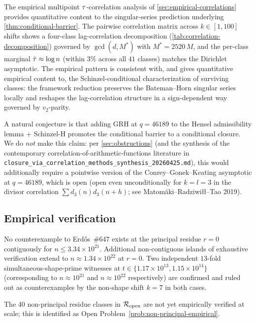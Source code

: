 \begin{remark}
\label{rem:conditional-empirical-anchor}
The empirical multipoint $\tau$-correlation analysis of
\cref{sec:empirical-correlations} provides quantitative content to
the singular-series prediction underlying
\cref{thm:conditional-barrier}. The pairwise correlation matrix
across $k \in [1, 100]$ shifts shows a four-class lag-correlation
decomposition (\cref{tab:correlation-decomposition}) governed by
$\gcd(d, M^*)$ with $M^* = 2520\, M$, and the per-class marginal
$\bar{\tau} \approx \log n$ (within $3\%$ across all $41$ classes)
matches the Dirichlet asymptotic. The empirical pattern is consistent
with, and gives quantitative empirical content to, the
Schinzel-conditional characterization of surviving classes: the
framework reduction preserves the Bateman--Horn singular series
locally and reshapes the lag-correlation structure in a
sign-dependent way governed by $v_2$-parity.
\end{remark}

\begin{remark}
\label{rem:no-cgk-closure}
A natural conjecture is that adding GRH at $q = 46189$ to the
Hensel admissibility lemma + Schinzel-H promotes the conditional
barrier to a conditional closure. We do \emph{not} make this claim:
per
\cref{sec:obstructions} (and the synthesis of the contemporary
correlation-of-arithmetic-functions literature in
\texttt{closure\_via\_correlation\_methods\_synthesis\_20260425.md}),
this would additionally require a pointwise version of the
Conrey--Gonek--Keating asymptotic at $q = 46189$, which is open
(open even unconditionally for $k = l = 3$ in the divisor
correlation $\sum d_3(n) d_3(n+h)$; see Matomäki--Radziwiłł--Tao
2019).
\end{remark}

\subsection{Empirical verification}
\label{sec:thm:empirical}

\begin{proposition}
\label{prop:empirical-r0}
No counterexample to Erd\H{o}s~\#647 exists at the principal
residue $r = 0$ contiguously for $n \le 3.34 \times 10^{21}$.
Additional non-contiguous islands of exhaustive verification extend
to $n \approx 1.34 \times 10^{22}$ at $r = 0$. Two independent
$13$-fold simultaneous-shape-prime witnesses at
$t \in \{1.17 \times 10^{13}, 1.15 \times 10^{14}\}$
(corresponding to $n \approx 10^{21}$ and $n \approx 10^{22}$
respectively) are confirmed and ruled out as counterexamples by the
non-shape shift $k = 7$ in both cases.

The 40 non-principal residue classes in $\mathcal{R}_{\mathrm{open}}$ are not yet
empirically verified at scale; this is identified as Open
Problem~\ref{prob:non-principal-empirical}.
\end{proposition}

